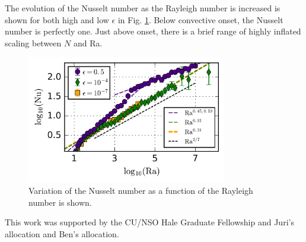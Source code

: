 \documentclass[aps, prl, twocolumn, groupedaddress]{revtex4-1}
\begin{document}
The evolution of the Nusselt number as the Rayleigh number is increased is shown for both high and low
$\epsilon$ in Fig. \ref{fig:nu_v_ra}.  Below convective onset, the Nusselt number is perfectly one. Just above
onset, there is a brief range of highly inflated scaling between $N$ and Ra. 

\begin{figure}[t]
\includegraphics[width=3.4375in]{./figs/nu_v_ra.png}
\caption{Variation of the Nusselt number as a function of the Rayleigh number is shown.
\label{fig:nu_v_ra} }
\end{figure}




\begin{acknowledgements}
This work was supported by the CU/NSO Hale Graduate Fellowship and Juri's allocation and Ben's allocation.
\end{acknowledgements}


\end{document}
